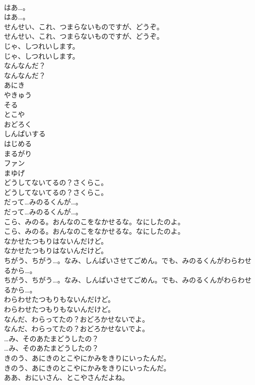 \documentclass[8pt]{extreport}
\begin{document}
\begin{CJK}{UTF8}{min}
\\	はあ…。	
\\	はあ…。 
\\	せんせい、これ、つまらないものですが、どうぞ。	
\\	せんせい、これ、つまらないものですが、どうぞ。 
\\	じゃ、しつれいします。	
\\	じゃ、しつれいします。 
\\	なんなんだ？	
\\	なんなんだ？ 
\\	あにき
\\	やきゅう
\\	そる
\\	とこや
\\	おどろく
\\	しんぱいする
\\	はじめる
\\	まるがり
\\	ファン
\\	まゆげ
\\	どうしてないてるの？さくらこ。	
\\	どうしてないてるの？さくらこ。 
\\	だって…みのるくんが…。	
\\	だって…みのるくんが…。 
\\	こら、みのる。おんなのこをなかせるな。なにしたのよ。	
\\	こら、みのる。おんなのこをなかせるな。なにしたのよ。 
\\	なかせたつもりはないんだけど。	
\\	なかせたつもりはないんだけど。 
\\	ちがう、ちがう…。なみ、しんぱいさせてごめん。でも、みのるくんがわらわせるから…。	
\\	ちがう、ちがう…。なみ、しんぱいさせてごめん。でも、みのるくんがわらわせるから…。 
\\	わらわせたつもりもないんだけど。	
\\	わらわせたつもりもないんだけど。 
\\	なんだ、わらってたの？おどろかせないでよ。	
\\	なんだ、わらってたの？おどろかせないでよ。 
\\	…み、そのあたまどうしたの？	
\\	…み、そのあたまどうしたの？ 
\\	きのう、あにきのとこやにかみをきりにいったんだ。	
\\	きのう、あにきのとこやにかみをきりにいったんだ。 
\\	ああ、おにいさん、とこやさんだよね。	

\end{CJK}
\end{document}
